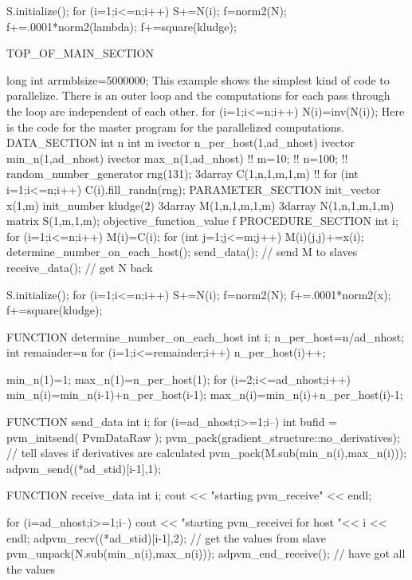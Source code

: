    S.initialize();
   for (i=1;i<=n;i++)
   {
     S+=N(i);
   }
   f=norm2(N);
   f+=.0001*norm2(lambda);
   f+=square(kludge);
  
TOP_OF_MAIN_SECTION
  
  long int arrmblsize=5000000;
\endexample
This example shows the simplest kind of code to parallelize.
There is an outer loop and the computations for each pass
through the loop are independent of each other.
\beginexample
   for (i=1;i<=n;i++)
   {
     N(i)=inv(N(i));
   }
\endexample
Here is the code for the master program for the parallelized computations.
\beginexample
DATA_SECTION
  int n
  int m
  ivector n_per_host(1,ad_nhost)
  ivector min_n(1,ad_nhost)
  ivector max_n(1,ad_nhost)
 !! m=10;
 !! n=100;
 !! random_number_generator rng(131);
  3darray C(1,n,1,m,1,m)
 !! for (int i=1;i<=n;i++) C(i).fill_randn(rng);
PARAMETER_SECTION
  init_vector x(1,m)
  init_number kludge(2)
  3darray M(1,n,1,m,1,m)
  3darray N(1,n,1,m,1,m)
  matrix S(1,m,1,m);
  objective_function_value f
PROCEDURE_SECTION
   int i;
   for (i=1;i<=n;i++)
   {
     M(i)=C(i);
     for (int j=1;j<=m;j++)
     {
       M(i)(j,j)+=x(i);
     }
   }
   determine_number_on_each_host();
   send_data(); // send M to slaves
   receive_data(); // get N back
   
   S.initialize();
   for (i=1;i<=n;i++)
   {
     S+=N(i);
   }
   f=norm2(N);
   f+=.0001*norm2(x);
   f+=square(kludge);
  
FUNCTION  determine_number_on_each_host
  int i;
  n_per_host=n/ad_nhost;
  int remainder=n%
  for (i=1;i<=remainder;i++) n_per_host(i)++;


  min_n(1)=1;
  max_n(1)=n_per_host(1);
  for (i=2;i<=ad_nhost;i++) 
  {
    min_n(i)=min_n(i-1)+n_per_host(i-1);
    max_n(i)=min_n(i)+n_per_host(i)-1;
  }

FUNCTION send_data
  int i;
  for (i=ad_nhost;i>=1;i--) 
  {
    int bufid = pvm_initsend( PvmDataRaw );
    pvm_pack(gradient_structure::no_derivatives); // tell slaves if derivatives are calculated
    pvm_pack(M.sub(min_n(i),max_n(i)));
    adpvm_send((*ad_stid)[i-1],1);
  }

FUNCTION receive_data
  int i;
  cout << "starting pvm_receive" << endl;
  
  for (i=ad_nhost;i>=1;i--) 
  {
    cout << "starting pvm_receivei for host "<< i << endl;
    adpvm_recv((*ad_stid)[i-1],2);  // get the values from slave
    pvm_unpack(N.sub(min_n(i),max_n(i)));
    adpvm_end_receive();  // have got all the values
  }
 

